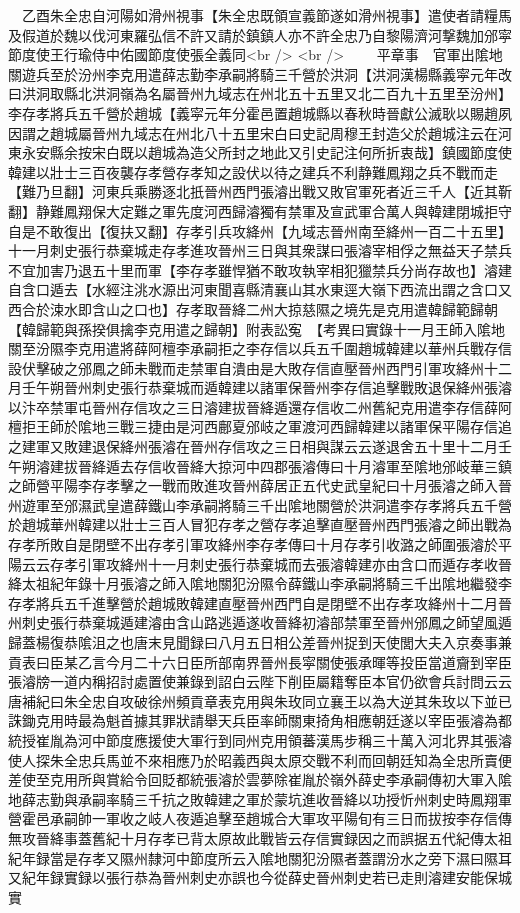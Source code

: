 　乙酉朱全忠自河陽如滑州視事【朱全忠既領宣義節遂如滑州視事】遣使者請糧馬及假道於魏以伐河東羅弘信不許又請於鎮鎮人亦不許全忠乃自黎陽濟河撃魏加邠寜節度使王行瑜侍中佑國節度使張全義同<br />
<br />
　　平章事　官軍出隂地關遊兵至於汾州李克用遣薛志勤李承嗣將騎三千營於洪洞【洪洞漢楊縣義寜元年改曰洪洞取縣北洪洞嶺為名屬晉州九域志在州北五十五里又北二百九十五里至汾州】李存孝將兵五千營於趙城【義寜元年分霍邑置趙城縣以春秋時晉獻公滅耿以賜趙夙因謂之趙城屬晉州九域志在州北八十五里宋白曰史記周穆王封造父於趙城注云在河東永安縣余按宋白既以趙城為造父所封之地此又引史記注何所折衷哉】鎮國節度使韓建以壯士三百夜襲存孝營存孝知之設伏以待之建兵不利静難鳳翔之兵不戰而走【難乃旦翻】河東兵乘勝逐北扺晉州西門張濬出戰又敗官軍死者近三千人【近其靳翻】静難鳳翔保大定難之軍先度河西歸濬獨有禁軍及宣武軍合萬人與韓建閉城拒守自是不敢復出【復扶又翻】存孝引兵攻絳州【九域志晉州南至絳州一百二十五里】十一月刺史張行恭棄城走存孝進攻晉州三日與其衆謀曰張濬宰相俘之無益天子禁兵不宜加害乃退五十里而軍【李存孝雖悍猶不敢攻執宰相犯獵禁兵分尚存故也】濬建自含口遁去【水經注洮水源出河東聞喜縣清襄山其水東逕大嶺下西流出謂之含口又西合於涑水即含山之口也】存孝取晉絳二州大掠慈隰之境先是克用遣韓歸範歸朝【韓歸範與孫揆俱擒李克用遣之歸朝】附表訟寃　【考異曰實錄十一月王師入隂地關至汾隰李克用遣將薛阿檀李承嗣拒之李存信以兵五千圍趙城韓建以華州兵戰存信設伏擊破之邠鳳之師未戰而走禁軍自潰由是大敗存信直壓晉州西門引軍攻絳州十二月壬午朔晉州刺史張行恭棄城而遁韓建以諸軍保晉州李存信追擊戰敗退保絳州張濬以汴卒禁軍屯晉州存信攻之三日濬建拔晉絳遁還存信收二州舊紀克用遣李存信薛阿檀拒王師於隂地三戰三捷由是河西鄜夏邠岐之軍渡河西歸韓建以諸軍保平陽存信追之建軍又敗建退保絳州張濬在晉州存信攻之三日相與謀云云遂退舍五十里十二月壬午朔濬建拔晉絳遁去存信收晉絳大掠河中四郡張濬傳曰十月濬軍至隂地邠岐華三鎮之師營平陽李存孝擊之一戰而敗進攻晉州薛居正五代史武皇紀曰十月張濬之師入晉州遊軍至邠濕武皇遣薛鐵山李承嗣將騎三千出隂地關營於洪洞遣李存孝將兵五千營於趙城華州韓建以壯士三百人冒犯存孝之營存孝追擊直壓晉州西門張濬之師出戰為存孝所敗自是閉壁不出存孝引軍攻絳州李存孝傳曰十月存孝引收潞之師圍張濬於平陽云云存孝引軍攻絳州十一月刺史張行恭棄城而去張濬韓建亦由含口而遁存孝收晉絳太祖紀年錄十月張濬之師入隂地關犯汾隰令薛鐵山李承嗣將騎三千出隂地繼發李存孝將兵五千進擊營於趙城敗韓建直壓晉州西門自是閉壁不出存孝攻絳州十二月晉州刺史張行恭棄城遁建濬由含山路逃遁遂收晉絳初濬部禁軍至晉州邠鳳之師望風遁歸蓋楊復恭隂沮之也唐末見聞録曰八月五日相公差晉州捉到天使閭大夫入京奏事兼貢表曰臣某乙言今月二十六日臣所部南界晉州長寜關使張承暉等投臣當道齎到宰臣張濬牓一道内稱招討處置使兼錄到詔白云陛下削臣屬籍奪臣本官仍欲會兵討問云云唐補紀曰朱全忠自攻破徐州頻貢章表克用與朱玫同立襄王以為大逆其朱玫以下並已誅鋤克用時最為魁首據其罪狀請舉天兵臣率師關東掎角相應朝廷遂以宰臣張濬為都統授崔胤為河中節度應援使大軍行到同州克用領蕃漢馬步稱三十萬入河北界其張濬使人探朱全忠兵馬並不來相應乃於昭義西與太原交戰不利而回朝廷知為全忠所賣便差使至克用所與賞給令回貶都統張濬於雲夢除崔胤於嶺外薛史李承嗣傳初大軍入隂地薛志勤與承嗣率騎三千抗之敗韓建之軍於蒙坑進收晉絳以功授忻州刺史時鳳翔軍營霍邑承嗣帥一軍收之岐人夜遁追擊至趙城合大軍攻平陽旬有三日而拔按李存信傳無攻晉絳事蓋舊紀十月存孝已背太原故此戰皆云存信實録因之而誤据五代紀傳太祖紀年録當是存孝又隰州隸河中節度所云入隂地關犯汾隰者蓋謂汾水之旁下濕曰隰耳又紀年録實録以張行恭為晉州刺史亦誤也今從薛史晉州刺史若已走則濬建安能保城實